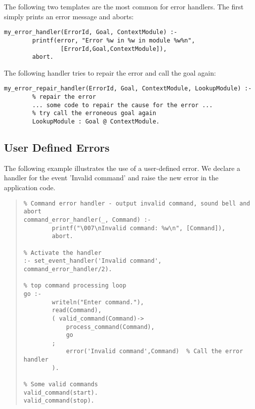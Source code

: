 The following two templates are the most common for error handlers.
The first simply prints an error message and aborts:
\begin{verbatim}
my_error_handler(ErrorId, Goal, ContextModule) :-
        printf(error, "Error %w in %w in module %w%n",
                [ErrorId,Goal,ContextModule]),
        abort.
\end{verbatim}
The following handler tries to repair the error and call the goal again:
\begin{verbatim}
my_error_repair_handler(ErrorId, Goal, ContextModule, LookupModule) :-
        % repair the error
        ... some code to repair the cause for the error ...
        % try call the erroneous goal again
        LookupModule : Goal @ ContextModule.
\end{verbatim}



\subsection{User Defined Errors}
\label{user-errors}
The following example illustrates the use of a user-defined error.
We declare a handler for the event 'Invalid command' and
raise the new error in the application code.
\begin{quote}
\begin{verbatim}
% Command error handler - output invalid command, sound bell and abort
command_error_handler(_, Command) :-
        printf("\007\nInvalid command: %w\n", [Command]),
        abort.

% Activate the handler
:- set_event_handler('Invalid command', command_error_handler/2).

% top command processing loop
go :-
        writeln("Enter command."),
        read(Command),
        ( valid_command(Command)->
            process_command(Command),
            go
        ;
            error('Invalid command',Command)  % Call the error handler
        ).

% Some valid commands
valid_command(start).
valid_command(stop).
\end{verbatim}
\end{quote}



